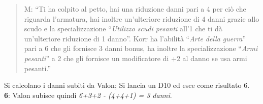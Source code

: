 \documentclass[../manuale_main.tex]{subfiles}
\begin{document}
\begin{framed}
\begin{quote}
M: ``Ti ha colpito al petto, hai una riduzione danni pari a 4 per ciò che riguarda l'armatura, hai inoltre un'ulteriore riduzione di 4 danni grazie allo scudo e la specializzazione ``\emph{Utilizzo scudi pesanti} all'1 che ti dà un'ulteriore riduzione di 1 danno''. Korr ha l'abilità ``\emph{Arte della guerra}'' pari a 6 che gli fornisce 3 danni bonus, ha inoltre la specializzazione ``\emph{Armi pesanti}'' a 2 che gli fornisce un modificatore di +2 al danno se usa armi pesanti.''\\
\end{quote}
Si calcolano i danni subiti da Valon; Si lancia un D10 ed esce come risultato 6.\\
\textbf{6}: Valon subisce quindi \textit{6+3+2 - (4+4+1) = 3 danni}.\\
\end{framed}
\end{document}
